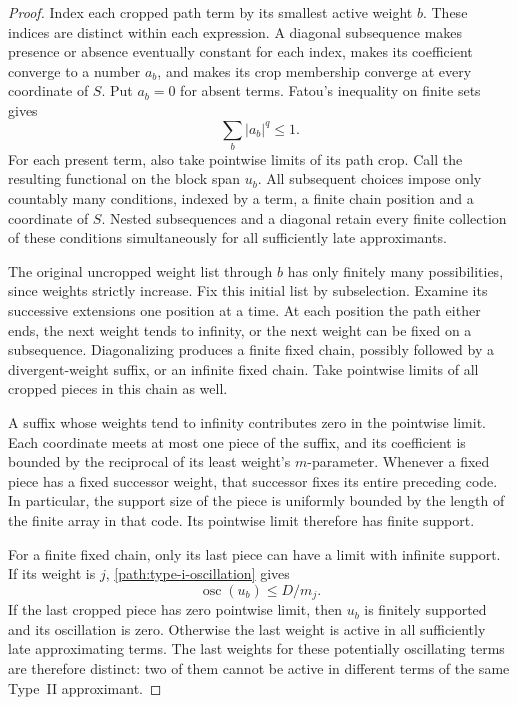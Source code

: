 \begin{proof}
Index each cropped path term by its smallest active weight $b$.
These indices are distinct within each expression.  A diagonal
subsequence makes presence or absence eventually constant for each index,
makes its coefficient converge to a number $a_b$, and makes its crop
membership converge at every coordinate of $S$.  Put $a_b=0$ for
absent terms.  Fatou's inequality on finite sets gives
\begin{equation}
 \sum_b|a_b|^q\le1.
 \label{path:limit-coefficients}
\end{equation}
For each present term, also take pointwise limits of its path crop.
Call the resulting functional on the block span $u_b$.
All subsequent choices impose only countably many conditions, indexed
by a term, a finite chain position and a coordinate of $S$. Nested
subsequences and a diagonal retain every finite collection of these
conditions simultaneously for all sufficiently late approximants.

The original uncropped weight list through $b$ has only finitely many
possibilities, since weights strictly increase.  Fix this initial
list by subselection.  Examine its successive extensions one position
at a time.  At each position the path either ends, the next weight
tends to infinity, or the next weight can be fixed on a subsequence.
Diagonalizing produces a finite fixed chain, possibly followed by a
divergent-weight suffix, or an infinite fixed chain.  Take pointwise
limits of all cropped pieces in this chain as well.

A suffix whose weights tend to infinity contributes zero in the
pointwise limit.  Each coordinate meets at most one piece of the
suffix, and its coefficient is bounded by the reciprocal of its
least weight's $m$-parameter.  Whenever a fixed piece has a fixed
successor weight, that successor fixes its entire preceding code.
In particular, the support size of the piece is uniformly bounded
by the length of the finite array in that code.  Its pointwise limit
therefore has finite support.

For a finite fixed chain, only its last piece can have a limit with
infinite support.  If its weight is $j$,
\eqref{path:type-i-oscillation} gives
\begin{equation}
 \operatorname{osc}(u_b)\le D/m_j.
 \label{path:finite-chain-oscillation}
\end{equation}
If the last cropped piece has zero pointwise limit, then $u_b$ is
finitely supported and its oscillation is zero.  Otherwise the last
weight is active in all sufficiently late approximating terms.
The last weights for these potentially oscillating terms are
therefore distinct: two of them cannot be active in different terms
of the same Type~II approximant.


\end{proof}
